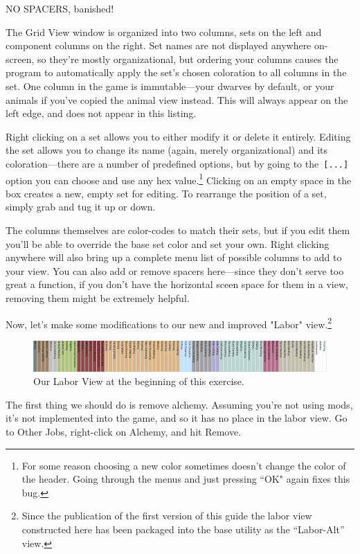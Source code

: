 \documentclass[]{article}
\begin{document}
NO SPACERS, banished!

The Grid View window is organized into two columns, sets on the left and
component columns on the right. Set names are not displayed anywhere on-screen, so they're mostly
organizational, but ordering your columns causes the program to automatically apply the set's chosen
coloration to all columns in the set. One column in the game is immutable---your dwarves by default, or
your animals if you've copied the animal view instead. This will always appear on the left edge, and does
not appear in this listing.

Right clicking on a set allows you to either modify it or delete it entirely. Editing the set allows you
to change its name (again, merely organizational) and its coloration---there are a number of predefined
options, but by going to the\texttt{ [...]} option you can choose and use any hex value.\footnote{For
some reason choosing a new color sometimes doesn't change the color of the header. Going through the
menus and just pressing ``OK" again fixes this bug.} Clicking on an empty space in the box creates a new,
empty set for editing. To rearrange the position of a set, simply grab and tug it up or down.

The columns themselves are color-codes to match their sets, but if you edit them you'll be able to
override the base set color and set your own. Right clicking anywhere will also bring up a complete
menu list of possible columns to add to your view. You can also add or remove spacers here---since they
don't serve too great a function, if you don't have the horizontal sceen space for them in a view,
removing them might be extremely helpful.

Now, let's make some modifications to our new and improved "Labor" view.\footnote{Since the publication
of the first version of this guide the labor view constructed here has been packaged into the base
utility as the ``Labor-Alt'' view.}

\begin{figure}[h!]
\centering \includegraphics[scale=.47]{Sec3Fig17}
\caption{Our Labor View at the beginning of this exercise.}
\end{figure}

The first thing we should do is remove alchemy. Assuming you're not using mods, it's not implemented into
the game, and so it has no place in the labor view. Go to Other Jobs, right-click on Alchemy, and hit
Remove.
\vspace{12pt}
\end{document}
